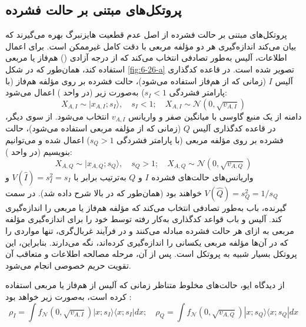 \subsection{پروتکل‌های مبتنی بر حالت فشرده}
\label{sec:6-10-2}
پروتکل‌های مبتنی بر حالت فشرده از اصل عدم قطعیت هایزنبرگ بهره می‌گیرند که بیان می‌کند اندازه‌گیری هر دو مؤلفه مربعی با دقت کامل غیرممکن است. برای اعمال اطلاعات، آلیس به‌طور تصادفی انتخاب می‌کند که از درجه آزادی () هم‌فاز یا مربعی استفاده کند، همان‌طور که در شکل \ref{fig:6-26-a} تصویر شده است. در قاعده کدگذاری آلیس $I$ (زمانی که از  هم‌فاز استفاده می‌شود)، حالت فشرده بر روی مؤلفه هم‌فاز (با پارامتر فشردگی $s_I < 1$) به‌صورت زیر (در واحد ) اعمال می‌شود:
\begin{equation}
	X_{A,I} \sim |x_{A,I}; s_I\rangle, \quad s_I < 1; \quad X_{A,I} \sim \mathcal{N}(0, \sqrt{v_{A,I}})
	\label{eq:6-78}
\end{equation}
دامنه از یک منبع گاوسی با میانگین صفر و واریانس $v_{A,I}$ انتخاب می‌شود. از سوی دیگر، در قاعده کدگذاری آلیس $Q$ (زمانی که از مؤلفه مربعی استفاده می‌شود)، حالت فشرده بر روی مؤلفه مربعی (با پارامتر فشردگی $s_Q > 1$) اعمال شده و می‌توانیم بنویسیم (در واحد ):
\begin{equation}
	X_{A,Q} \sim |x_{A,Q}; s_Q\rangle, \quad s_Q > 1; \quad X_{A,Q} \sim \mathcal{N}(0, \sqrt{v_{A,Q}})
	\label{eq:6-79}
\end{equation}
واریانس‌های حالت‌های فشرده $I$ و $Q$ به‌ترتیب برابر با $V(\hat{I}) = s_I^2 = s_I$ و $V(\hat{Q}) = s_Q^2 = 1/s_Q$ خواهند بود (همان‌طور که در بالا شرح داده شد). در سمت گیرنده، باب به‌طور تصادفی انتخاب می‌کند که مؤلفه هم‌فاز یا مربعی را اندازه‌گیری کند. آلیس و باب قواعد کدگذاری به‌کار رفته توسط خود را برای اندازه‌گیری مؤلفه مربعی به ازای هر حالت فشرده مبادله می‌کنند و در فرآیند غربال‌گری، تنها مواردی را که در آن‌ها مؤلفه مربعی یکسانی را اندازه‌گیری کرده‌اند، نگه می‌دارند. بنابراین، این پروتکل بسیار شبیه به پروتکل  است. پس از آن، مرحله مصالحه اطلاعات و متعاقب آن تقویت حریم خصوصی انجام می‌شود.

از دیدگاه ایو، حالت‌های مخلوط متناظر زمانی که آلیس از  هم‌فاز یا مربعی استفاده کرده است، به‌صورت زیر خواهد بود \cite{8}:
\begin{equation}
	\rho_I = \int f_{\mathcal{N}}(0, \sqrt{v_{A,I}}) |x; s_I\rangle \langle x; s_I| dx; \quad \rho_Q = \int f_{\mathcal{N}}(0, \sqrt{v_{A,Q}}) |x; s_Q\rangle \langle x; s_Q| dx
	\label{eq:6-80}
\end{equation}

